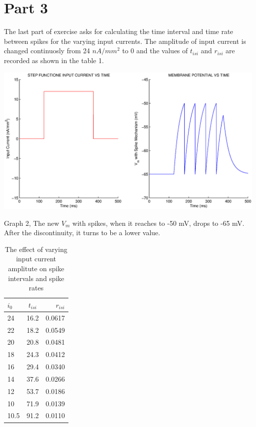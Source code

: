 \documentclass{article}
\begin{document}
\section*{Part 3}

The last part of exercise asks for calculating the time interval and time rate between spikes for the varying input currents. The amplitude of input current is changed continuosly from 24 $nA/mm^{2}$ to 0 and the values of $t_{isi}$ and $r_{isi}$ are recorded as shown in the table 1. 

\begin{center}
 
\includegraphics[width=\textwidth]{q8.eps}

Graph 2, The new $V_{m}$ with spikes, when it reaches to -50 mV,  drops to -65 mV. After the discontinuity, it turns to be a lower value.
\end{center}

\begin {table} [h]
\caption { The effect of varying input current amplitute on spike intervals and spike rates} \label{tab:title}
\begin{center}
  \begin{tabular}{ l | c | r }


    \hline
$i_{0}$ & $t_{isi}$ & $r_{isi}$\\ \hline \hline
 
    24 & 16.2 & 0.0617 \\ \hline
    22 & 18.2 & 0.0549 \\ \hline
    20 & 20.8 & 0.0481 \\ \hline
    18 & 24.3 & 0.0412 \\ \hline
    16 & 29.4 & 0.0340 \\ \hline
    14 & 37.6 & 0.0266 \\ \hline
    12 & 53.7 & 0.0186 \\ \hline
    10 & 71.9 & 0.0139 \\ \hline
  10.5 & 91.2 & 0.0110 \\ \hline



  \end{tabular}
\end{center}

\end{table}
\end{document}
